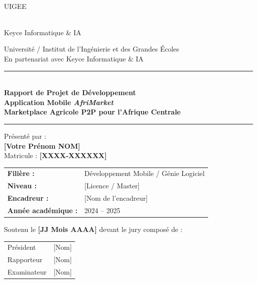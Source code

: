\documentclass[12pt, a4paper, oneside]{report}
\begin{document}
\begin{titlepage}
  \centering
  \begin{minipage}[c]{0.35\textwidth}
    \centering
    \fbox{\rule{0pt}{1.5cm}\rule{3cm}{0pt}}\\[2pt]
    {\small UIGEE}
  \end{minipage}
  \hfill
  \begin{minipage}[c]{0.35\textwidth}
    \centering
    \fbox{\rule{0pt}{1.5cm}\rule{3cm}{0pt}}\\[2pt]
    {\small Keyce Informatique \& IA}
  \end{minipage}

  \vspace{1.5cm}
  {\small Université / Institut de l'Ingénierie et des Grandes Écoles}\\[0.3cm]
  {\small En partenariat avec Keyce Informatique \& IA}

  \vspace{1cm}
  \rule{\linewidth}{1pt}\\[0.4cm]
  {\LARGE\bfseries\color{NavyBlue}
    Rapport de Projet de Développement\\[0.3cm]
    Application Mobile \textit{AfriMarket}\\[0.2cm]
    Marketplace Agricole P2P pour l'Afrique Centrale
  }\\[0.3cm]
  \rule{\linewidth}{1pt}

  \vspace{1cm}
  {\large Présenté par :}\\[0.4cm]
  {\Large\bfseries [Votre Prénom NOM]}\\[0.2cm]
  {\large Matricule : \textbf{[XXXX-XXXXXX]}}

  \vspace{1cm}
  \begin{tabular}{ll}
    \textbf{Filière :}       & Développement Mobile / Génie Logiciel \\[4pt]
    \textbf{Niveau :}        & [Licence / Master] \\[4pt]
    \textbf{Encadreur :}     & [Nom de l'encadreur] \\[4pt]
    \textbf{Année académique :} & 2024 -- 2025 \\
  \end{tabular}

  \vfill
  {\small Soutenu le \textbf{[JJ Mois AAAA]} devant le jury composé de :}\\[0.3cm]
  \begin{tabular}{ll}
    Président  & [Nom] \\
    Rapporteur & [Nom] \\
    Examinateur & [Nom] \\
  \end{tabular}
\end{titlepage}
\end{document}
